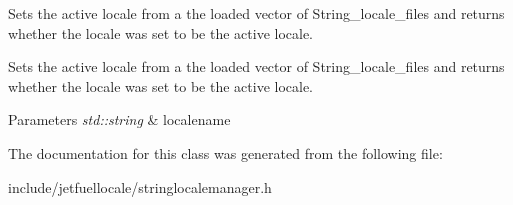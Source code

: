 Sets the active locale from a the loaded vector of String\+\_\+locale\+\_\+files and returns whether the locale was set to be the active locale. 

Sets the active locale from a the loaded vector of String\+\_\+locale\+\_\+files and returns whether the locale was set to be the active locale.


\begin{DoxyParams}{Parameters}
{\em std\+::string} & localename \\
\hline
\end{DoxyParams}


The documentation for this class was generated from the following file\+:\begin{DoxyCompactItemize}
\item 
include/jetfuellocale/stringlocalemanager.\+h\end{DoxyCompactItemize}
